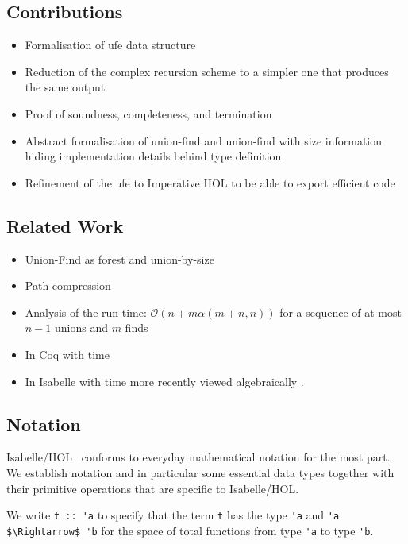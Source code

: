 \documentclass[
  sigplan,
  10pt,
  anonymous,
  review,
  ]{acmart}
\begin{document}
\subsection{Contributions}
\begin{itemize}
  \item Formalisation of \acrshort{ufe} data structure
  \item Reduction of the complex recursion scheme to a simpler one that produces the same output
  \item Proof of soundness, completeness, and termination
  \item Abstract formalisation of union-find and union-find with size information hiding implementation details behind type definition
  \item Refinement of the \acrshort{ufe} to Imperative HOL to be able to export efficient code
\end{itemize}

\subsection{Related Work}
\begin{itemize}
  \item Union-Find as forest and union-by-size \cite{uf_by_size}
  \item Path compression \cite{uf_compress}
  \item Analysis of the run-time: $\mathcal{O}(n + m \alpha(m + n, n))$ for a sequence of at most $n - 1$ unions and $m$ finds \cite{uf_ub_improved}
  \item In Coq \cite{uf_coq} with time \cite{uf_coq_time}
  \item In Isabelle \cite{uf_isabelle} with time \cite{uf_isabelle} more recently viewed algebraically \cite{uf_isabelle_algebraic}.
\end{itemize}

\subsection{Notation}
Isabelle/HOL~\cite{isabelle} conforms to everyday mathematical notation for the most part.
We establish notation and in particular some essential data types together with their primitive operations that are specific to Isabelle/HOL.

We write \lstinline!t :: 'a! to specify that the term \lstinline!t! has the type \lstinline!'a! and \lstinline!'a $\Rightarrow$ 'b! for the space of total functions from type \lstinline!'a! to type \lstinline!'b!.
\end{document}

